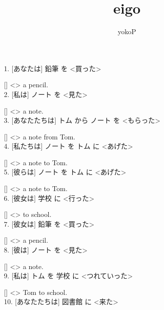 \documentclass[uplatex,
paper=a4,
fontsize=18pt,
jafontsize=16pt,
number_of_lines=30,
line_length=30zh,
baselineskip=25pt,
]{jlreq}
\author{yokoP}
\title{eigo}
\begin{document}
1.  [あなたは] 鉛筆 を <買った>

  [\hspace{3em}] <\hspace{3em}> a pencil.
\\

2.  [私は] ノート を <見た>

  [\hspace{3em}] <\hspace{3em}> a note.
\\

3.  [あなたたちは] トム から ノート を <もらった>

  [\hspace{3em}] <\hspace{3em}> a note from Tom.
\\

4.  [私たちは] ノート を トム に <あげた>

  [\hspace{3em}] <\hspace{3em}> a note to Tom.
\\

5.  [彼らは] ノート を トム に <あげた>

  [\hspace{3em}] <\hspace{3em}> a note to Tom.
\\

6.  [彼女は] 学校 に <行った>

  [\hspace{3em}] <\hspace{3em}> to school.
\\

7.  [彼女は] 鉛筆 を <買った>

  [\hspace{3em}] <\hspace{3em}> a pencil.
\\

8.  [彼は] ノート を <見た>

  [\hspace{3em}] <\hspace{3em}> a note.
\\

9.  [私は] トム を 学校 に <つれていった>

  [\hspace{3em}] <\hspace{3em}> Tom to school.
\\

10.  [あなたたちは] 図書館 に <来た>
\end{document}
